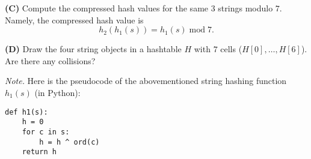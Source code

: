 \documentclass[a4paper,12pt]{article}
\begin{document}
\vspace{10pt}
{\bf (C)} Compute the compressed hash values for the same 3 strings
modulo $7$. Namely, 
the compressed hash value is 
$$h_2(h_1(s)) = h_1(s)\;\text{mod}\;7.$$

\vspace{10pt}
{\bf (D)} Draw the four string objects in a hashtable $H$ with $7$ cells
($H[0],\ldots,H[6]$). Are there any collisions?

\vspace{30pt}
{\em Note.} 
Here is the pseudocode of the abovementioned string hashing function $h_1(s)$ (in Python): 
\begin{verbatim}
def h1(s):
    h = 0
    for c in s:
        h = h ^ ord(c)
    return h
\end{verbatim}



\end{document}
